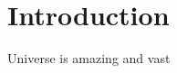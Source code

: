 \chapter{\label{intro}Introduction}
Universe is amazing and vast
\setcounter{equation}{0}
\setcounter{table}{0}
\setcounter{figure}{0}


    



